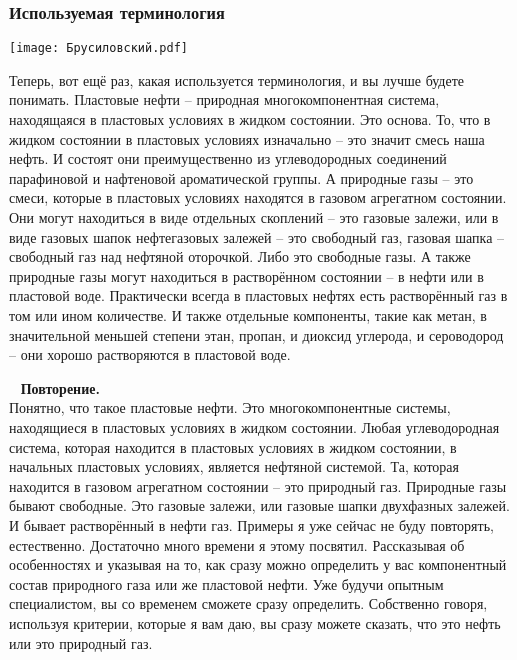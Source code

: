 \documentclass[main.tex]{subfiles}
\begin{document}
\subsubsection{Используемая терминология}

\begin{center}
\texttt{[image: Брусиловский.pdf]}
\end{center}

Теперь, вот ещё раз, какая используется терминология, и вы лучше будете понимать.
Пластовые нефти -- природная многокомпонентная система, находящаяся в пластовых условиях в жидком состоянии.
Это основа.
То, что в жидком состоянии в пластовых условиях изначально -- это значит смесь наша нефть.
И состоят они преимущественно из углеводородных соединений парафиновой и нафтеновой ароматической группы.
А природные газы -- это смеси, которые в пластовых условиях находятся в газовом агрегатном состоянии.
Они могут находиться в виде отдельных скоплений -- это газовые залежи, или в виде газовых шапок нефтегазовых залежей -- это свободный газ, газовая шапка -- свободный газ над нефтяной оторочкой.
Либо это свободные газы.
А также природные газы могут находиться в растворённом состоянии -- в нефти или в пластовой воде.
Практически всегда в пластовых нефтях есть растворённый газ в том или ином количестве.
И также отдельные компоненты, такие как метан, в значительной меньшей степени этан, пропан,
и диоксид углерода, и сероводород -- они хорошо растворяются в пластовой воде.

\ \newline
\textbf{Повторение.}\\
Понятно, что такое пластовые нефти.
Это многокомпонентные системы, находящиеся в пластовых условиях в жидком состоянии.
Любая углеводородная система, которая находится в пластовых условиях в жидком состоянии, в начальных пластовых условиях, является нефтяной системой.
Та, которая находится в газовом агрегатном состоянии -- это природный газ.
Природные газы бывают свободные.
Это газовые залежи, или газовые шапки двухфазных залежей.
И бывает растворённый в нефти газ.
Примеры я уже сейчас не буду повторять, естественно.
Достаточно много времени я этому посвятил.
Рассказывая об особенностях и указывая на то, как сразу можно определить у вас компонентный состав природного газа или же пластовой нефти.
Уже будучи опытным специалистом, вы со временем сможете сразу определить.
Собственно говоря, используя критерии, которые я вам даю, вы сразу можете сказать, что это нефть или это природный газ.
\end{document}

